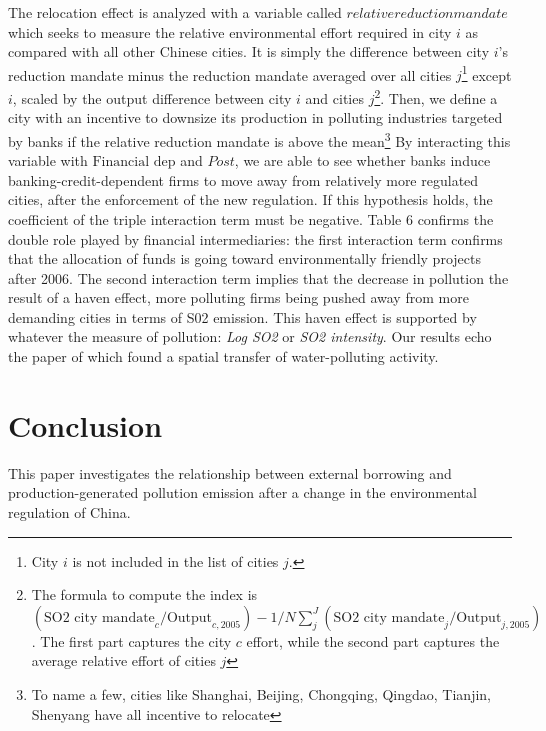 \documentclass[12pt]{article}
\begin{document}
The relocation effect is analyzed with a variable called $relative reduction mandate$ which seeks to measure the relative environmental effort required in city $i$ as compared with all other Chinese cities. It is simply the difference between city $i$'s reduction mandate minus the reduction mandate averaged over all cities $j$\footnote{City $i$  is not included in the list of cities $j$.} except $i$, scaled by the output difference between city $i$ and cities $j$\footnote{The formula to compute the index is $(\text{SO2 city mandate}_c/\text{Output}_{c, 2005}) - 1/N\sum _j ^J(\text{SO2 city mandate}_j/\text{Output}_{j, 2005})$. The first part captures the city $c$ effort, while the second part captures the average relative effort of cities $j$}. Then, we define a city with an incentive to downsize its production in polluting industries targeted by banks if the relative reduction mandate is above the mean\footnote{To name a few, cities like Shanghai, Beijing, Chongqing, Qingdao, Tianjin, Shenyang have all incentive to relocate} By interacting this variable with $\text{Financial dep}$ and $Post$, we are able to see whether banks induce banking-credit-dependent firms to move away from relatively more regulated cities, after the enforcement of the new regulation. If this hypothesis holds, the coefficient of the triple interaction term must be negative. Table 6 confirms the double role played by financial intermediaries: the first interaction term confirms that the allocation of funds is going toward environmentally friendly projects after 2006. The second interaction term implies that the decrease in pollution the result of a haven effect, more polluting firms being pushed away from more demanding cities in terms of S02 emission. This haven effect is supported by whatever the measure of pollution: \textit{Log SO2} or \textit{SO2 intensity}. Our results echo the paper of \cite{Chen2018-ki} which found a spatial transfer of water-polluting activity.

\section{Conclusion}

This paper investigates the relationship between external borrowing and production-generated pollution emission after a change in the environmental regulation of China.
\end{document}
